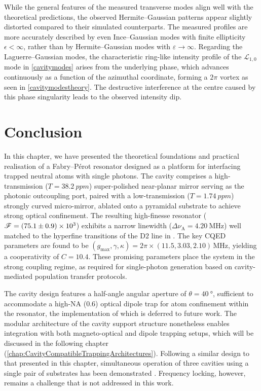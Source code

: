 \documentclass[../Thesis-IJspeert.tex]{subfiles}
\begin{document}
While the general features of the measured transverse modes align well with the theoretical predictions, the observed Hermite--Gaussian patterns appear slightly distorted compared to their simulated counterparts. The measured profiles are more accurately described by even Ince--Gaussian modes with finite ellipticity $\epsilon < \infty$, rather than by Hermite--Gaussian modes with $\varepsilon \to \infty$. Regarding the Laguerre--Gaussian modes, the characteristic ring-like intensity profile of the $\mathcal{L}_{1,0}$ mode in \autoref{cavitymodes} arises from the underlying phase, which advances continuously as a function of the azimuthal coordinate, forming a $2\pi$ vortex as seen in \autoref{cavitymodestheory}. The destructive interference at the centre caused by this phase singularity leads to the observed intensity dip.

\section{Conclusion}
In this chapter, we have presented the theoretical foundations and practical realisation of a Fabry--Pérot resonator designed as a platform for interfacing trapped neutral atoms with single photons. The cavity comprises a high-transmission ($T = \SI{38.2}{ppm}$) super-polished near-planar mirror serving as the photonic outcoupling port, paired with a low-transmission ($T = \SI{1.74}{ppm}$) strongly curved micro-mirror, ablated onto a pyramidal substrate to achieve strong optical confinement. The resulting high-finesse resonator ($\mathcal{F} = \num{75.1 \pm 0.9e3}$) exhibits a narrow linewidth ($\Delta\nu_\mathrm{A} = \SI{4.20}{\mega\hertz}$) well matched to the hyperfine transitions of the $\mathrm{D}2$ line in . The key CQED parameters are found to be $(g_\mathrm{max}, \gamma, \kappa) = 2\pi \times (11.5, 3.03, 2.10)\,\si{\mega\hertz}$, yielding a cooperativity of $C = \num{10.4}$. These promising parameters place the system in the strong coupling regime, as required for single-photon generation based on cavity-mediated population transfer protocols.

The cavity design features a half-angle angular aperture of $\theta = \SI{40}{\degree}$, sufficient to accommodate a high-NA (\num{0.6}) optical dipole trap for atom confinement within the resonator, the implementation of which is deferred to future work. The modular architecture of the cavity support structure nonetheless enables integration with both magneto-optical and dipole trapping setups, which will be discussed in the following chapter (\autoref{chap:CavityCompatibleTrappingArchitectures}). Following a similar design to that presented in this chapter, simultaneous operation of three cavities using a single pair of substrates has been demonstrated \cite{Doherty2023}. Frequency locking, however, remains a challenge that is not addressed in this work.
\end{document}
